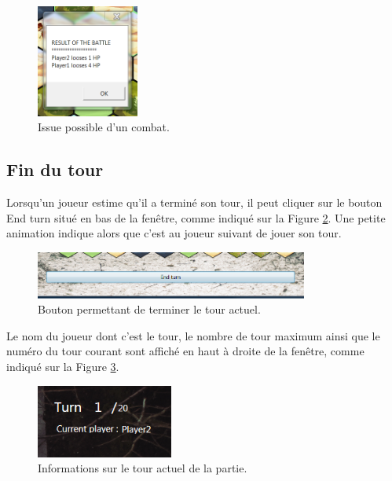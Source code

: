 		\begin{figure}
			\begin{center}
				\includegraphics[width=0.3\textwidth]{figure/issuecomb.png}
			\end{center}
			\caption{Issue possible d'un combat.}
			\label{fig:comb}
		\end{figure}
		
		
		\subsection{Fin du tour}
		Lorsqu'un joueur estime qu'il a terminé son tour, il peut cliquer sur le bouton \og End turn \og{} situé en bas de la fenêtre, comme indiqué sur la {\sc Figure }{\ref {fig:endturn}}. Une petite animation indique alors que c'est au joueur suivant de jouer son tour.
		
		\begin{figure}
			\begin{center}
				\includegraphics[width=0.8\textwidth]{figure/endturn.png}
			\end{center}
			\caption{Bouton permettant de terminer le tour actuel.}
			\label{fig:endturn}
		\end{figure}
		
		Le nom du joueur dont c'est le tour, le nombre de tour maximum ainsi que le numéro du tour courant sont affiché en haut à droite de la fenêtre, comme indiqué sur la {\sc Figure }{\ref {fig:turn}}.
		
		\begin{figure}
			\begin{center}
				\includegraphics[width=0.4\textwidth]{figure/turn.png}
			\end{center}
			\caption{Informations sur le tour actuel de la partie.}
			\label{fig:turn}
		\end{figure}
				
